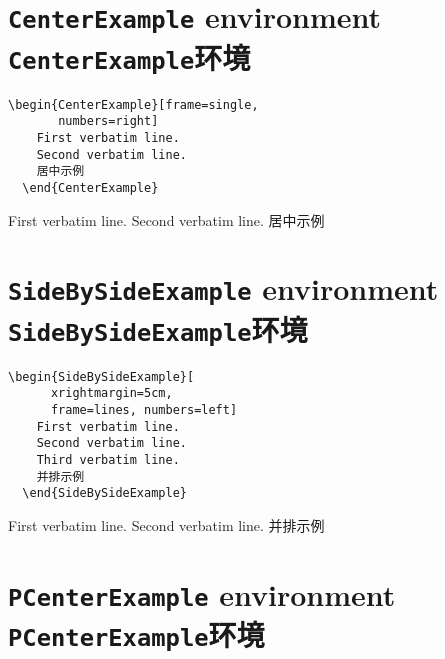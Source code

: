 \documentclass[twoside]{article}
\begin{document}
\begin{changebar}
\newpage

\section{\texttt{CenterExample} environment\\\texttt{CenterExample}环境}

\begin{Verbatim}[gobble=2]
  \begin{CenterExample}[frame=single,
       numbers=right]
    First verbatim line.
    Second verbatim line.
    居中示例
  \end{CenterExample}
\end{Verbatim}

\begin{CenterExample}[frame=single,numbers=right]
  First verbatim line.
  Second verbatim line.
  居中示例
\end{CenterExample}


\section{\texttt{SideBySideExample} environment\\\texttt{SideBySideExample}环境}

\begin{Verbatim}[gobble=2]
  \begin{SideBySideExample}[
      xrightmargin=5cm,
      frame=lines, numbers=left]
    First verbatim line.
    Second verbatim line.
    Third verbatim line.
    并排示例
  \end{SideBySideExample}
\end{Verbatim}

\begin{SideBySideExample}[xrightmargin=5cm,frame=single,numbers=left]
  First verbatim line.
  Second verbatim line.
  并排示例
\end{SideBySideExample}



\iffalse


\section{\texttt{PCenterExample} environment\\\texttt{PCenterExample}环境}


\end{changebar}
\end{document}
